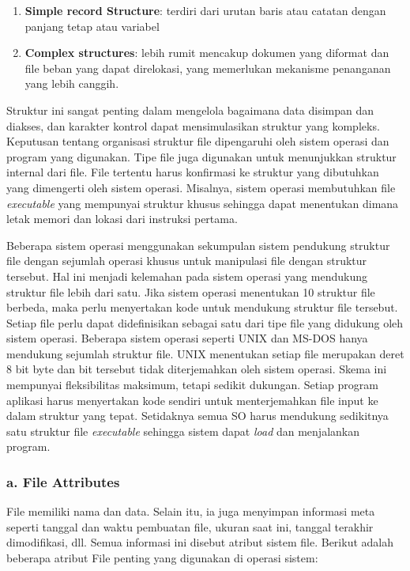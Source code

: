 \documentclass[12pt]{article}
\begin{document}
\begin{enumerate}
    \item \textbf{Simple record Structure}: terdiri dari urutan baris atau catatan dengan panjang tetap atau variabel
    \item \textbf{Complex structures}: lebih rumit mencakup dokumen yang diformat dan file beban yang dapat direlokasi, yang memerlukan mekanisme penanganan yang lebih canggih.
\end{enumerate}

Struktur ini sangat penting dalam mengelola bagaimana data disimpan dan diakses, dan karakter kontrol dapat mensimulasikan struktur yang kompleks. Keputusan tentang organisasi struktur file dipengaruhi oleh sistem operasi dan program yang digunakan. Tipe file juga digunakan untuk menunjukkan struktur internal dari file. File tertentu harus konfirmasi ke struktur yang dibutuhkan yang dimengerti oleh sistem operasi. Misalnya, sistem operasi membutuhkan file \textit{executable} yang mempunyai struktur khusus sehingga dapat menentukan dimana letak memori dan lokasi dari instruksi pertama.

Beberapa sistem operasi menggunakan sekumpulan sistem pendukung struktur file dengan sejumlah operasi khusus untuk manipulasi file dengan struktur tersebut. Hal ini menjadi kelemahan pada sistem operasi yang mendukung struktur file lebih dari satu. Jika sistem operasi menentukan 10 struktur file berbeda, maka perlu menyertakan kode untuk mendukung struktur file tersebut. Setiap file perlu dapat didefinisikan sebagai satu dari tipe file yang didukung oleh sistem operasi. Beberapa sistem operasi seperti UNIX dan MS-DOS hanya mendukung sejumlah struktur file. UNIX menentukan setiap file merupakan deret 8 bit byte dan bit tersebut tidak diterjemahkan oleh sistem operasi. Skema ini mempunyai fleksibilitas maksimum, tetapi sedikit dukungan. Setiap program aplikasi harus menyertakan kode sendiri untuk menterjemahkan file input ke dalam struktur yang tepat. Setidaknya semua SO harus mendukung sedikitnya satu struktur file \textit{executable} sehingga sistem dapat \textit{load} dan menjalankan program.

\subsubsection*{a. File Attributes }
File memiliki nama dan data. Selain itu, ia juga menyimpan informasi meta seperti tanggal dan waktu pembuatan file, ukuran saat ini, tanggal terakhir dimodifikasi, dll. Semua informasi ini disebut atribut sistem file. Berikut adalah beberapa atribut File penting yang digunakan di operasi sistem:
\end{document}
